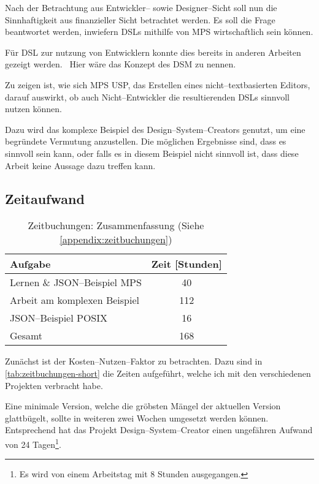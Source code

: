 Nach der Betrachtung aus Entwickler-- sowie Designer--Sicht soll nun die Sinnhaftigkeit aus finanzieller Sicht betrachtet werden.
Es soll die Frage beantwortet werden, inwiefern \acp{DSL} mithilfe von \ac{MPS} wirtschaftlich sein können.

Für \ac{DSL} zur nutzung von Entwicklern konnte dies bereits in anderen Arbeiten gezeigt werden.~\autocite{mellegard-2016}
Hier wäre das Konzept des \ac{DSM} zu nennen.

Zu zeigen ist, wie sich \ac{MPS} \ac{USP}, das Erstellen eines nicht--textbasierten Editors, darauf auswirkt, ob auch Nicht--Entwickler die resultierenden \acp{DSL} sinnvoll nutzen können.

Dazu wird das komplexe Beispiel des Design--System--Creators genutzt, um eine begründete Vermutung anzustellen.
Die möglichen Ergebnisse sind, dass es sinnvoll sein kann, oder falls es in diesem Beispiel nicht sinnvoll ist, dass diese Arbeit keine Aussage dazu treffen kann.

\subsection{Zeitaufwand}\label{subsec:zeitaufwand}
\begin{table}[ht]
    \centering
    \begin{tabular}{|l|c|}
        \hline
        Aufgabe                                & Zeit [Stunden] \\
        \hline
        \hline
        Lernen \& \ac{JSON}--Beispiel \ac{MPS} & 40             \\
        \hline
        Arbeit am komplexen Beispiel           & 112            \\
        \hline
        \ac{JSON}--Beispiel \ac{POSIX}         & 16             \\
        \hline
        \hline
        Gesamt                                 & 168            \\
        \hline
    \end{tabular}
    \caption{Zeitbuchungen: Zusammenfassung (Siehe \autoref{appendix:zeitbuchungen})}
    \label{tab:zeitbuchungen-short}
\end{table}
Zunächst ist der Kosten--Nutzen--Faktor zu betrachten.
Dazu sind in \autoref{tab:zeitbuchungen-short} die Zeiten aufgeführt, welche ich mit den verschiedenen Projekten verbracht habe.

Eine minimale Version, welche die gröbsten Mängel der aktuellen Version glattbügelt, sollte in weiteren zwei Wochen umgesetzt werden können.
Entsprechend hat das Projekt Design--System--Creator einen ungefähren Aufwand von 24 Tagen\footnote{Es wird von einem Arbeitstag mit 8 Stunden ausgegangen.}.

